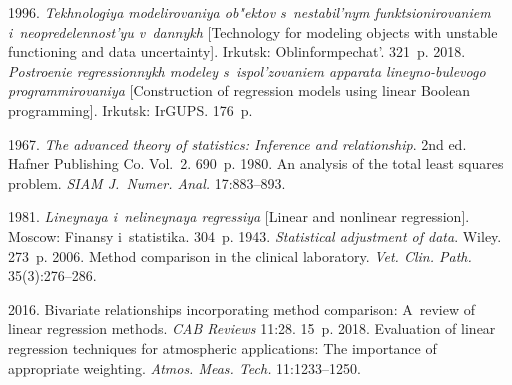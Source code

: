 

 


 \begin{multicols}{2}

\renewcommand{\bibname}{\protect\rmfamily References}

{\small\frenchspacing
 {%
 \begin{thebibliography}{99}

 1996. \textit{Tekhnologiya modelirovaniya ob"ektov s~nestabil'nym 
funktsionirovaniem i~neopredelennost'yu v~dannykh} [Technology for modeling objects with unstable 
functioning and data uncertainty]. Irkutsk: Oblinformpechat'. 321~p.
 2018. \textit{Postroenie regressionnykh modeley 
s~ispol'zovaniem apparata lineyno-bulevogo programmirovaniya} [Construction of regression models using 
linear Boolean programming]. Irkutsk: \mbox{IrGUPS}. 176~p.

 1967. \textit{The
advanced theory of statistics: Inference and relationship}.
2nd ed. Hafner Publishing Co. Vol.~2. 690~p.
 1980. An analysis of the total least squares problem. 
\textit{SIAM J.~Numer. Anal.} 17:883--893.

 1981. \textit{Lineynaya i~nelineynaya regressiya} [Linear and nonlinear 
regression]. Moscow: Finansy i~statistika. 304~p.
 1943. \textit{Statistical adjustment of data}. Wiley. 273~p.
 2006. Method comparison in the clinical laboratory. 
\textit{Vet. Clin. Path.} 35(3):276--286.

 2016. Bivariate 
relationships incorporating method comparison: A~review of 
linear regression methods. \textit{CAB 
Reviews} 11:28. 15~p.
 2018. Evaluation of linear regression techniques for atmospheric applications: 
The importance of appropriate weighting. \textit{Atmos. Meas. Tech.} 11:1233--1250.


\end{thebibliography}}}
\end{multicols}
